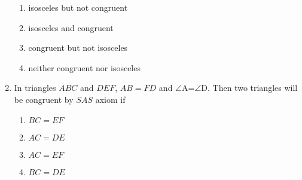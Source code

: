 \documentclass{article}
\begin{document}
\begin{enumerate}
\begin{enumerate}
\item isosceles but not congruent	
\item isosceles and congruent
\item congruent but not isosceles
\item neither congruent nor isosceles
\end{enumerate}
\item In triangles $ABC$ and $DEF$, $AB=FD$ and $\angle$A=$\angle$D. Then two triangles will be congruent by $SAS$ axiom if
\begin{enumerate}
\item $BC=EF$
\item $AC=DE$
\item $AC=EF$
\item $BC=DE$
\end{enumerate}
\end{enumerate}
\end{document}
